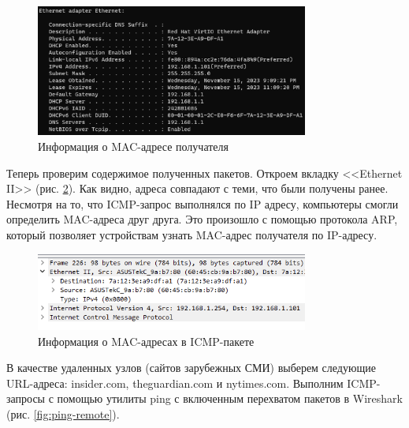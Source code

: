 \documentclass[a4paper, 14pt]{extarticle}
\begin{document}
\begin{figure}[H]
  \centering
  \includegraphics[width=0.8\textwidth]{images/ipconfig.png}
  \caption{Информация о MAC-адресе получателя}
  \label{fig:ipconfig}
\end{figure}

Теперь проверим содержимое полученных пакетов. Откроем вкладку <<Ethernet II>>
(рис. \ref{fig:ethernet-info}). Как видно, адреса совпадают с теми, что были
получены ранее. Несмотря на то, что ICMP-запрос выполнялся по IP адресу,
компьютеры смогли определить MAC-адреса друг друга. Это произошло с помощью
протокола ARP, который позволяет устройствам узнать MAC-адрес получателя по
IP-адресу.

\begin{figure}[H]
  \centering
  \includegraphics[width=0.8\textwidth]{images/ethernet-info.png}
  \caption{Информация о MAC-адресах в ICMP-пакете}
  \label{fig:ethernet-info}
\end{figure}

В качестве удаленных узлов (сайтов зарубежных СМИ) выберем следующие URL-адреса:
insider.com, theguardian.com и nytimes.com. Выполним ICMP-запросы с помощью
утилиты ping с включенным перехватом пакетов в Wireshark (рис.
\ref{fig:ping-remote}).
\end{document}
